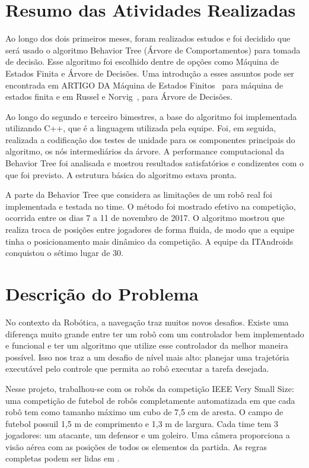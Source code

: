 \documentclass[a4paper,12pt]{article}
\begin{document}
\section{Resumo das Atividades Realizadas}
\label{secao:atividades_realizadas}

Ao longo dos dois primeiros meses, foram realizados estudos e foi decidido que será usado o algoritmo Behavior Tree (Árvore de Comportamentos) para tomada de decisão. Esse algoritmo foi escolhido dentre de opções como Máquina de Estados Finita e Árvore de Decisões. Uma introdução a esses assuntos pode ser encontrada em ARTIGO DA Máquina de Estados Finitos~\cite{orozcomaquinas} para máquina de estados finita e em Russel e Norvig~\cite{decision_tree}, para Árvore de Decisões. 



Ao longo do segundo e terceiro bimestres, a base do algoritmo foi implementada utilizando C++, que é a linguagem utilizada pela equipe. Foi, em seguida, realizada a codificação dos testes de unidade para os componentes principais do algoritmo, os nós intermediários da árvore. A performance computacional da Behavior Tree foi analisada e mostrou resultados satisfatórios e condizentes com o que foi previsto. A estrutura básica do algoritmo estava pronta.

A parte da Behavior Tree que considera as limitações de um robô real foi implementada e testada no time. 
O método  foi mostrado efetivo na competição, ocorrida entre os dias 7 a 11 de novembro de 2017. O algoritmo mostrou que realiza troca de posições entre jogadores de forma fluida, de modo que a equipe tinha o posicionamento mais dinâmico da competição. A equipe da ITAndroids conquistou o sétimo lugar de 30.

\section{Descrição do Problema}
\label{secao:enunciado_problema}

No contexto da Robótica, a navegação traz muitos novos desafios. Existe uma diferença muito grande entre ter um robô com um controlador bem implementado e funcional e ter um algoritmo que utilize esse controlador da melhor maneira possível. Isso nos traz a um desafio de nível mais alto: planejar uma trajetória executável pelo controle que permita ao robô executar a tarefa desejada.

Nesse projeto, trabalhou-se com os robôs da competição IEEE Very Small Size: uma competição de futebol de robôs completamente automatizada em que cada robô tem como tamanho máximo um cubo de 7,5 cm de aresta. O campo de futebol possuil 1,5 m de comprimento e 1,3 m de largura. Cada time tem 3 jogadores: um atacante, um defensor e um goleiro. Uma câmera proporciona a visão aérea com as posições de todos os elementos da partida. As regras completas podem ser lidas em \cite{cbr2008}. 
\end{document}
